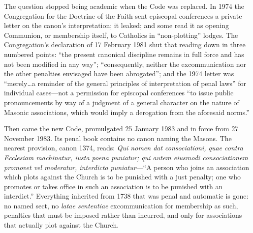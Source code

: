 The question stopped being academic when the Code was replaced. In 1974 the Congregation for the Doctrine of the Faith sent episcopal conferences a private letter on the canon's interpretation; it leaked; and some read it as opening Communion, or membership itself, to Catholics in ``non-plotting'' lodges. The Congregation's declaration of 17 February 1981 shut that reading down in three numbered points: ``the present canonical discipline remains in full force and has not been modified in any way''; ``consequently, neither the excommunication nor the other penalties envisaged have been abrogated''; and the 1974 letter was ``merely\ldots a reminder of the general principles of interpretation of penal laws'' for individual cases---not a permission for episcopal conferences ``to issue public pronouncements by way of a judgment of a general character on the nature of Masonic associations, which would imply a derogation from the aforesaid norms.''

Then came the new Code, promulgated 25 January 1983 and in force from 27 November 1983. Its penal book contains no canon naming the Masons. The nearest provision, canon 1374, reads: \emph{Qui nomen dat consociationi, quae contra Ecclesiam machinatur, iusta poena puniatur; qui autem eiusmodi consociationem promovet vel moderatur, interdicto puniatur}---``A person who joins an association which plots against the Church is to be punished with a just penalty; one who promotes or takes office in such an association is to be punished with an interdict.'' Everything inherited from 1738 that was penal and automatic is gone: no named sect, no \emph{latae sententiae} excommunication for membership as such, penalties that must be imposed rather than incurred, and only for associations that actually plot against the Church.

